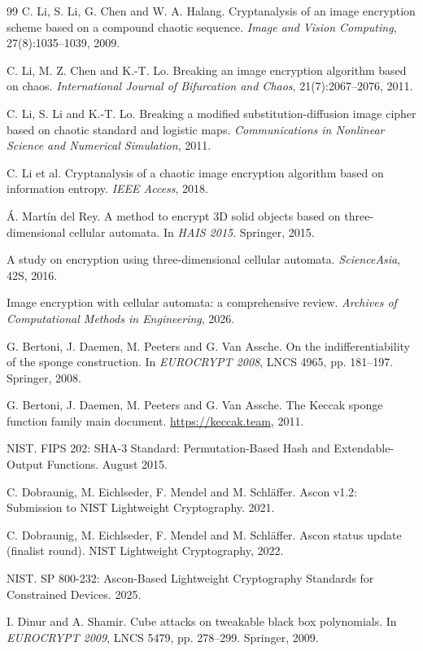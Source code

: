 \documentclass[11pt,a4paper]{article}
\theoremstyle{plain}
\theoremstyle{definition}
\theoremstyle{remark}
\begin{document}
\begin{thebibliography}{99}
 C. Li, S. Li, G. Chen and W. A. Halang. Cryptanalysis of an image
encryption scheme based on a compound chaotic sequence. \emph{Image and Vision Computing},
27(8):1035--1039, 2009.

 C. Li, M. Z. Chen and K.-T. Lo. Breaking an image encryption
algorithm based on chaos. \emph{International Journal of Bifurcation and Chaos},
21(7):2067--2076, 2011.

 C. Li, S. Li and K.-T. Lo. Breaking a modified substitution-diffusion
image cipher based on chaotic standard and logistic maps.
\emph{Communications in Nonlinear Science and Numerical Simulation}, 2011.

 C. Li et al. Cryptanalysis of a chaotic image encryption algorithm
based on information entropy. \emph{IEEE Access}, 2018.

 Á. Martín del Rey. A method to encrypt 3D solid objects based on
three-dimensional cellular automata. In \emph{HAIS 2015}. Springer, 2015.

 A study on encryption using three-dimensional cellular automata.
\emph{ScienceAsia}, 42S, 2016.

 Image encryption with cellular automata: a comprehensive review.
\emph{Archives of Computational Methods in Engineering}, 2026.

 G. Bertoni, J. Daemen, M. Peeters and G. Van Assche. On the
indifferentiability of the sponge construction. In \emph{EUROCRYPT 2008}, LNCS 4965,
pp. 181--197. Springer, 2008.

 G. Bertoni, J. Daemen, M. Peeters and G. Van Assche.
The Keccak sponge function family main document. \url{https://keccak.team}, 2011.

 NIST. FIPS 202: SHA-3 Standard: Permutation-Based Hash and
Extendable-Output Functions. August 2015.

 C. Dobraunig, M. Eichlseder, F. Mendel and M. Schläffer.
Ascon v1.2: Submission to NIST Lightweight Cryptography. 2021.

 C. Dobraunig, M. Eichlseder, F. Mendel and M. Schläffer.
Ascon status update (finalist round). NIST Lightweight Cryptography, 2022.

 NIST. SP 800-232: Ascon-Based Lightweight Cryptography Standards for
Constrained Devices. 2025.

 I. Dinur and A. Shamir. Cube attacks on tweakable black box polynomials.
In \emph{EUROCRYPT 2009}, LNCS 5479, pp. 278--299. Springer, 2009.


\end{thebibliography}
\end{document}

